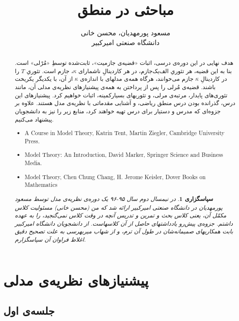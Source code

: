 \documentclass[12pt,a4paper]{report}
\title{مباحثی در منطق}
\author{مسعود پورمهدیان، محسن خانی\\
دانشگاه صنعتی امیرکبیر
}
\theoremstyle{colorhead}
\newtheorem*{sepas}{سپاسگزاری}
\begin{document}
\sloppy 
\maketitle
\begin{abstract}
هدف نهایی در این دوره‌ی درسی، اثبات «قضیه‌ی جازمیت»، ثابت‌شده توسطِ «مُرْلی» است. بنا به این قضیه، هر تئوریِ الف‌یک‌جازم، در هر کاردینالِ ناشمارای 
$\kappa$،
 جازم است. تئوریِ
 $T$
  را در کاردینالِ 
  $\kappa$
   جازم می‌خوانند، هرگاه همه‌ی مدلهای با اندازه‌ی
  $\kappa$
    از آن، با یکدیگر یکریخت باشند. 
قضیه‌ی مُرلی را پس از پرداختن به همه‌ی پیشنیازهای نظریه‌ی مدلی آن، مانند تئوری‌های پایدار، مرتبه‌ی مرلی، و تئوریهای بسیارکمینه، اثبات خواهیم کرد. 
 پیشنیازهای این درس، گذرانده بودن درس منطق ریاضی، و آشنایی مقدماتی با نظریه‌ی مدل هستند. علاوه‌ بر جزوه‌ای که مدرس و دستیار برای درس تهیه خواهند کرد، منابع زیر 
را نیز به دانشجویان پیشنهاد می‌کنیم.
\begin{latin}
\begin{itemize}
\item 
    A Course in Model Theory, Katrin Tent, Martin Ziegler, Cambridge University Press.
\item
Model Theory: An Introduction, David Marker, Springer Science and Business Media.
\item  
Model Theory, Chen Chung Chang, H. Jerome Keisler, Dover Books on Mathematics
\end{itemize}
    \end{latin}
        \begin{sepas}
در
نیمسال دوم سال
۹۵-۹۶
یک دوره‌ی نظریه‌ی مدل توسط مسعود پورمهدیان در دانشگاه صنعتی‌ امیرکبیر ارائه شد
که من (محسن خانی) 
مسئولیت کلاس مکمّل آن، یعنی کلاس بحث و تمرین و تدریس آنچه در وقت کلاس نمی‌گنجید، را 
به عهده داشتم. جزوه‌ی پیش‌رو یادداشتهای حاصل از آن کلاسهاست. از دانشجویان دانشگاه امیرکبیر
بابت همکاریهای صمیمانه‌شان در طول آن ترم، و از شهاب میربهرسی به علت
تصحیح 
دقیق
اغلاط فراوان آن
 سپاسگزارم.

    \end{sepas}
\end{abstract}
\tableofcontents
\pagebreak 
\chapter{پیشنیازهای نظریه‌ی مدلی}
\section{جلسه‌ی اول}
\end{document}
